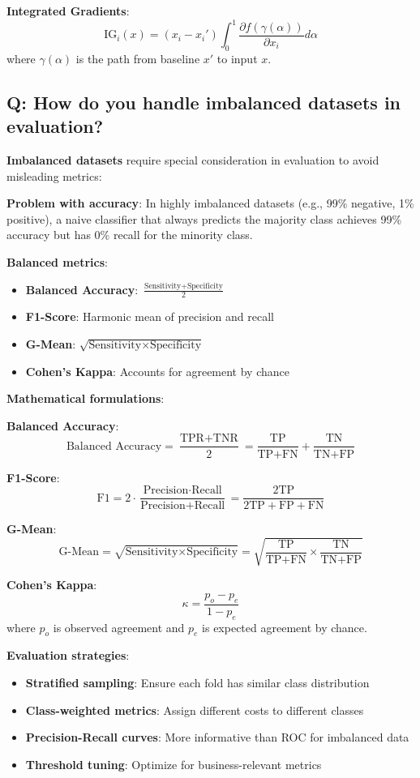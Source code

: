 \textbf{Integrated Gradients}:
\[
	\text{IG}_i(x) = (x_i - x_i') \int_0^1 \frac{\partial f(\gamma(\alpha))}{\partial x_i} d\alpha
\]
where \(\gamma(\alpha)\) is the path from baseline \(x'\) to input \(x\).

\subsection*{Q: How do you handle imbalanced datasets in evaluation?}
\textbf{Imbalanced datasets} require special consideration in evaluation to avoid misleading metrics:

\textbf{Problem with accuracy}:
In highly imbalanced datasets (e.g., 99\% negative, 1\% positive), a naive classifier that always predicts the majority class achieves 99\% accuracy but has 0\% recall for the minority class.

\textbf{Balanced metrics}:
\begin{itemize}
	\item \textbf{Balanced Accuracy}: \(\frac{\text{Sensitivity} + \text{Specificity}}{2}\)
	\item \textbf{F1-Score}: Harmonic mean of precision and recall
	\item \textbf{G-Mean}: \(\sqrt{\text{Sensitivity} \times \text{Specificity}}\)
	\item \textbf{Cohen's Kappa}: Accounts for agreement by chance
\end{itemize}

\textbf{Mathematical formulations}:

\textbf{Balanced Accuracy}:
\[
	\text{Balanced Accuracy} = \frac{\text{TPR} + \text{TNR}}{2} = \frac{\text{TP}}{\text{TP} + \text{FN}} + \frac{\text{TN}}{\text{TN} + \text{FP}}
\]

\textbf{F1-Score}:
\[
	\text{F1} = 2 \cdot \frac{\text{Precision} \cdot \text{Recall}}{\text{Precision} + \text{Recall}} = \frac{2 \text{TP}}{2 \text{TP} + \text{FP} + \text{FN}}
\]

\textbf{G-Mean}:
\[
	\text{G-Mean} = \sqrt{\text{Sensitivity} \times \text{Specificity}} = \sqrt{\frac{\text{TP}}{\text{TP} + \text{FN}} \times \frac{\text{TN}}{\text{TN} + \text{FP}}}
\]

\textbf{Cohen's Kappa}:
\[
	\kappa = \frac{p_o - p_e}{1 - p_e}
\]
where \(p_o\) is observed agreement and \(p_e\) is expected agreement by chance.

\textbf{Evaluation strategies}:
\begin{itemize}
	\item \textbf{Stratified sampling}: Ensure each fold has similar class distribution
	\item \textbf{Class-weighted metrics}: Assign different costs to different classes
	\item \textbf{Precision-Recall curves}: More informative than ROC for imbalanced data
	\item \textbf{Threshold tuning}: Optimize for business-relevant metrics
\end{itemize}

